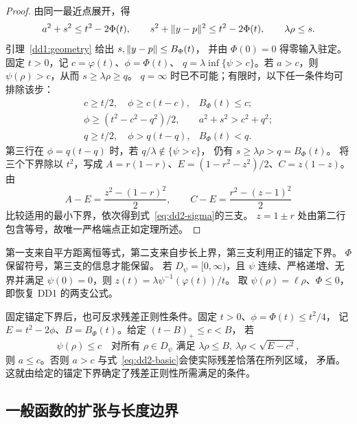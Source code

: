 \begin{proof}
由同一最近点展开，得
\begin{equation}\label{eq:dd2-basic}
 a^2+s^2\le t^2-2\Phi(t),\qquad
 s^2+\lVert y-p\rVert^2\le t^2-2\Phi(t),\qquad \lambda\rho\le s.
\end{equation}
引理~\ref{dd1:geometry} 给出 $s,\lVert y-p\rVert\le B_\Phi(t)$，
并由 $\Phi(0)=0$ 得零输入驻定。
固定 $t>0$，记 $c=\varphi(t)$、$\phi=\Phi(t)$、
$q=\lambda\inf\{\psi>c\}$。若 $a>c$，则 $\psi(\rho)>c$，从而 $s\ge\lambda\rho\ge q$。
$q=\infty$ 时已不可能；有限时，以下任一条件均可排除该步：
\[
 \begin{array}{ll}
 c\ge t/2,\quad \phi\ge c(t-c),& B_\Phi(t)\le c;\\
 \phi\ge(t^2-c^2-q^2)/2,& a^2+s^2>c^2+q^2;\\
 q\ge t/2,\quad \phi>q(t-q),& B_\Phi(t)<q.
 \end{array}
\]
第三行在 $\phi=q(t-q)$ 时，若 $q/\lambda\notin\{\psi>c\}$，
仍有 $s\ge\lambda\rho>q=B_\Phi(t)$。
将三个下界除以 $t^2$，写成
$A=r(1-r)$、$E=(1-r^2-z^2)/2$、$C=z(1-z)$。由
\[
 A-E=\frac{z^2-(1-r)^2}{2},\qquad
 C-E=\frac{r^2-(z-1)^2}{2}
\]
比较适用的最小下界，依次得到式~\eqref{eq:dd2-sigma}的三支。
$z=1\pm r$ 处由第二行包含等号，故唯一严格端点正如定理所述。
\end{proof}

第一支来自平方距离恒等式，第二支来自步长上界，第三支利用正的锚定下界。
$\Phi$ 保留符号，第三支的信息才能保留。
若 $D_\psi=[0,\infty)$，且 $\psi$ 连续、严格递增、无界并满足 $\psi(0)=0$，则
$z(t)=\lambda\psi^{-1}(\varphi(t))/t$。
取 $\psi(\rho)=\ell\rho$、$\Phi\le0$，即恢复 DD1 的两支公式。

固定锚定下界后，也可反求残差正则性条件。固定 $t>0$、$\phi=\Phi(t)\le t^2/4$，
记 $E=t^2-2\phi$、$B=B_\Phi(t)$。给定 $(t-B)_+\le c<B$，
若
\begin{equation}\label{eq:dd2-dual-cap}
 \psi(\rho)\le c\quad
 \text{对所有 }\rho\in D_\psi\text{ 满足 }\lambda\rho\le B,\
 \lambda\rho<\sqrt{E-c^2},
\end{equation}
则 $a\le c$。否则 $a>c$ 与式~\eqref{eq:dd2-basic}会使实际残差恰落在所列区域，
矛盾。这就由给定的锚定下界确定了残差正则性所需满足的条件。

\subsection{一般函数的扩张与长度边界}

